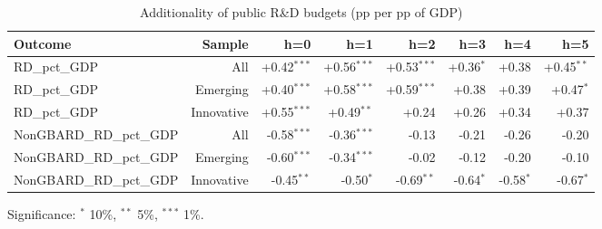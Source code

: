 \begin{table}[htbp]
\centering\small
\caption{Additionality of public R\&D budgets (pp per pp of GDP)}
\label{tab:gbard}
\begin{tabular}{lrrrrrrr}
\toprule
Outcome & Sample & h=0 & h=1 & h=2 & h=3 & h=4 & h=5 \\
\midrule
RD\_pct\_GDP & All & +0.42$^{***}$ & +0.56$^{***}$ & +0.53$^{***}$ & +0.36$^{*}$ & +0.38 & +0.45$^{**}$ \\
RD\_pct\_GDP & Emerging & +0.40$^{***}$ & +0.58$^{***}$ & +0.59$^{***}$ & +0.38 & +0.39 & +0.47$^{*}$ \\
RD\_pct\_GDP & Innovative & +0.55$^{***}$ & +0.49$^{**}$ & +0.24 & +0.26 & +0.34 & +0.37 \\
NonGBARD\_RD\_pct\_GDP & All & -0.58$^{***}$ & -0.36$^{***}$ & -0.13 & -0.21 & -0.26 & -0.20 \\
NonGBARD\_RD\_pct\_GDP & Emerging & -0.60$^{***}$ & -0.34$^{***}$ & -0.02 & -0.12 & -0.20 & -0.10 \\
NonGBARD\_RD\_pct\_GDP & Innovative & -0.45$^{**}$ & -0.50$^{*}$ & -0.69$^{**}$ & -0.64$^{*}$ & -0.58$^{*}$ & -0.67$^{*}$ \\
\bottomrule
\end{tabular}
\par\footnotesize Significance: $^{*}$ 10\%, $^{**}$ 5\%, $^{***}$ 1\%.
\end{table}
